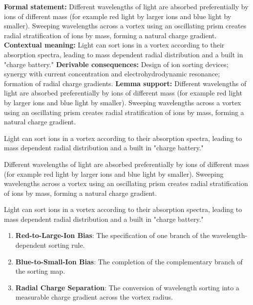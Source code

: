 \begingroup\footnotesize\setlength{\emergencystretch}{3em}\sloppy
\textbf{Formal statement:} Different wavelengths of light are absorbed preferentially by ions of different mass (for example red light by larger ions and blue light by smaller). Sweeping wavelengths across a vortex using an oscillating prism creates radial stratification of ions by mass, forming a natural charge gradient.
\textbf{Contextual meaning:} Light can sort ions in a vortex according to their absorption spectra, leading to mass dependent radial distribution and a built in "charge battery."
\textbf{Derivable consequences:} Design of ion sorting devices; synergy with current concentration and electrohydrodynamic resonance; formation of radial charge gradients.
\textbf{Lemma support:} Different wavelengths of light are absorbed preferentially by ions of different mass (for example red light by larger ions and blue light by smaller). Sweeping wavelengths across a vortex using an oscillating prism creates radial stratification of ions by mass, forming a natural charge gradient.\par
\endgroup

Light can sort ions in a vortex according to their absorption spectra, leading to mass dependent radial distribution and a built in "charge battery."

Different wavelengths of light are absorbed preferentially by ions of different mass (for example red light by larger ions and blue light by smaller). Sweeping wavelengths across a vortex using an oscillating prism creates radial stratification of ions by mass, forming a natural charge gradient.

Light can sort ions in a vortex according to their absorption spectra, leading to mass dependent radial distribution and a built in "charge battery."
\endgroup

\begin{enumerate}[leftmargin=1.6em,itemsep=6pt,topsep=4pt]
\item \textbf{Red-to-Large-Ion Bias}: The specification of one branch of the wavelength-dependent sorting rule.
\item \textbf{Blue-to-Small-Ion Bias}: The completion of the complementary branch of the sorting map.
\item \textbf{Radial Charge Separation}: The conversion of wavelength sorting into a measurable charge gradient across the vortex radius.
\end{enumerate}


